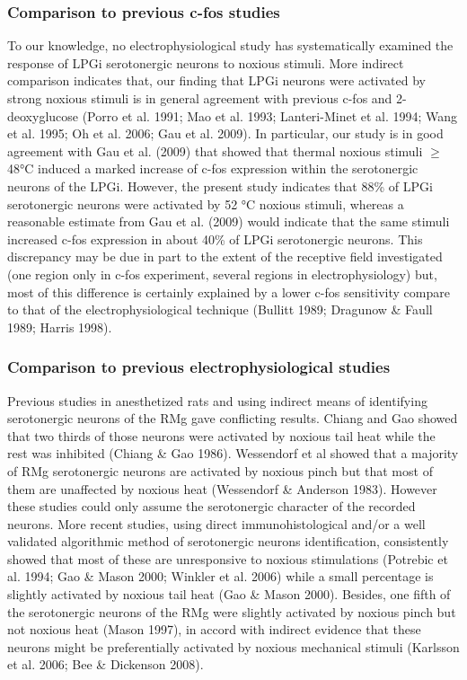 \documentclass[a4paper,12pt,twoside]{report}
\begin{document}
\subsubsection{Comparison to previous c-fos studies}

To our knowledge, no electrophysiological study has systematically examined the response of LPGi serotonergic neurons to noxious stimuli. More indirect comparison indicates that, our finding that LPGi neurons were activated by strong noxious stimuli is in general agreement with previous c-fos and 2-deoxyglucose (Porro et al. 1991; Mao et al. 1993; Lanteri-Minet et al. 1994; Wang et al. 1995; Oh et al. 2006; Gau et al. 2009). In particular, our study is in good agreement with Gau et al. (2009) that showed that thermal noxious stimuli $\ge$ 48°C induced a marked increase of c-fos expression within the serotonergic neurons of the LPGi. However, the present study indicates that 88\% of LPGi serotonergic neurons were activated by 52 °C noxious stimuli, whereas a reasonable estimate from Gau et al. (2009) would indicate that the same stimuli increased c-fos expression in about 40\% of LPGi serotonergic neurons. This discrepancy may be due in part to the extent of the receptive field investigated (one region only in c-fos experiment, several regions in electrophysiology) but, most of this difference is certainly explained by a lower c-fos sensitivity compare to that of the electrophysiological technique (Bullitt 1989; Dragunow \& Faull 1989; Harris 1998).

\subsubsection{Comparison to previous electrophysiological studies}

Previous studies in anesthetized rats and using indirect means of identifying serotonergic neurons of the RMg gave conflicting results. Chiang and Gao showed that two thirds of those neurons were activated by noxious tail heat while the rest was inhibited (Chiang \& Gao 1986). Wessendorf et al showed that a majority of RMg serotonergic neurons are activated by noxious pinch but that most of them are unaffected by noxious heat (Wessendorf \& Anderson 1983). However these studies could only assume the serotonergic character of the recorded neurons. More recent studies, using direct immunohistological and/or a well validated algorithmic method of serotonergic neurons identification, consistently showed that most of these are unresponsive to noxious stimulations (Potrebic et al. 1994; Gao \& Mason 2000; Winkler et al. 2006) while a small percentage is slightly activated by noxious tail heat (Gao \& Mason 2000). Besides, one fifth of the serotonergic neurons of the RMg were slightly activated by noxious pinch but not noxious heat (Mason 1997), in accord with indirect evidence that these neurons might be preferentially activated by noxious mechanical stimuli (Karlsson et al. 2006; Bee \& Dickenson 2008).
\end{document}
